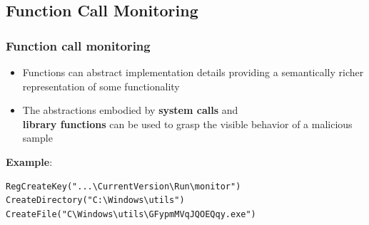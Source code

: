 \documentclass[compress]{beamer}
\begin{document}
\subsection{Function Call Monitoring}
\begin{frame}[fragile]
    \frametitle{Function call monitoring}

\begin{itemize}
\item Functions can abstract
implementation details providing
a semantically richer representation of some functionality
\item The abstractions embodied by \textbf{system calls} and \\ \textbf{library functions} can be used to grasp the visible behavior of a malicious sample 
\end{itemize}
\medskip
\textcolor{sapienza}{\textbf{Example}}:\\
\bigskip

\begin{beamerboxesrounded}[shadow=true]{}


\begin{lstlisting}[xleftmargin=0pt]
RegCreateKey("...\CurrentVersion\Run\monitor") 
CreateDirectory("C:\Windows\utils")
CreateFile("C\Windows\utils\GFypmMVqJQOEQqy.exe")
\end{lstlisting}

\end{beamerboxesrounded} 



\end{frame}
\end{document}
